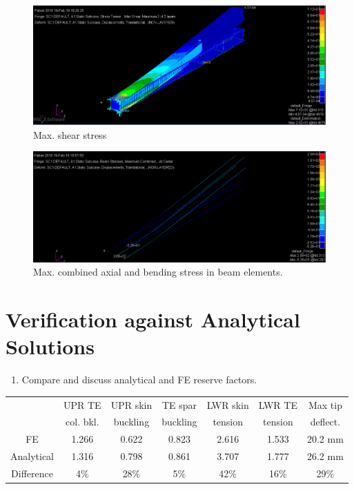 \documentclass[11pt,a4paper,oneside]{memoir}
\begin{document}
\begin{figure}[h]
    \centering
    \includegraphics[width = .8\textwidth]{figures/one-max-shear.png}
    \caption{Max. shear stress}
    \label{fig:max-shear}
\end{figure}
\begin{figure}[h]
    \centering
    \includegraphics[width = .8\textwidth]{figures/one-combined-beam-stress.png}
    \caption{Max. combined axial and bending stress in beam elements.}
    \label{fig:combined-beam}
\end{figure}

\section{Verification against Analytical Solutions}
\begin{enumerate}
	\item Compare and discuss analytical and FE reserve factors.
\end{enumerate}

\begin{center}
	\begin{tabular}{ccccccc}
		\toprule
		            & UPR TE   & UPR skin & TE spar  & LWR skin & LWR TE  & Max tip  \\
		            & col. bkl.& buckling & buckling & tension  & tension & deflect. \\
		\midrule
		FE          &  1.266  &  0.622  &  0.823  &  2.616 & 1.533  &  20.2 mm   \\
		\midrule
		Analytical  &  1.316  &  0.798  &  0.861  &  3.707  & 1.777  &  26.2 mm   \\
		\midrule
		Difference & 4\% & 28\% & 5\% & 42\% &16\% & 29\% \\
		\bottomrule
	\end{tabular}
\end{center}
\end{document}
